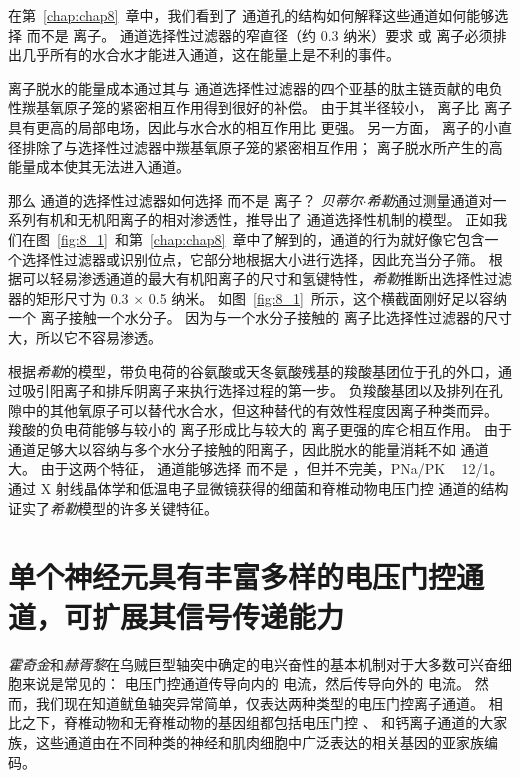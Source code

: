 在第~\ref{chap:chap8}~章中，我们看到了  通道孔的结构如何解释这些通道如何能够选择  而不是  离子。
 通道选择性过滤器的窄直径（约 0.3 纳米）要求  或  离子必须排出几乎所有的水合水才能进入通道，这在能量上是不利的事件。


 离子脱水的能量成本通过其与  通道选择性过滤器的四个亚基的肽主链贡献的电负性羰基氧原子笼的紧密相互作用得到很好的补偿。
由于其半径较小， 离子比  离子具有更高的局部电场，因此与水合水的相互作用比  更强。
另一方面， 离子的小直径排除了与选择性过滤器中羰基氧原子笼的紧密相互作用；
 离子脱水所产生的高能量成本使其无法进入通道。


那么  通道的选择性过滤器如何选择  而不是  离子？
\textit{贝蒂尔$\cdot$希勒}通过测量通道对一系列有机和无机阳离子的相对渗透性，推导出了  通道选择性机制的模型。
正如我们在图~\ref{fig:8_1}~和第~\ref{chap:chap8}~章中了解到的，通道的行为就好像它包含一个选择性过滤器或识别位点，它部分地根据大小进行选择，因此充当分子筛。
根据可以轻易渗透通道的最大有机阳离子的尺寸和氢键特性，\textit{希勒}推断出选择性过滤器的矩形尺寸为 0.3 × 0.5 纳米。
如图~\ref{fig:8_1}~所示，这个横截面刚好足以容纳一个  离子接触一个水分子。
因为与一个水分子接触的  离子比选择性过滤器的尺寸大，所以它不容易渗透。


根据\textit{希勒}的模型，带负电荷的谷氨酸或天冬氨酸残基的羧酸基团位于孔的外口，通过吸引阳离子和排斥阴离子来执行选择过程的第一步。
负羧酸基团以及排列在孔隙中的其他氧原子可以替代水合水，但这种替代的有效性程度因离子种类而异。
羧酸的负电荷能够与较小的  离子形成比与较大的  离子更强的库仑相互作用。
由于  通道足够大以容纳与多个水分子接触的阳离子，因此脱水的能量消耗不如  通道大。
由于这两个特征， 通道能够选择  而不是 ，但并不完美，PNa/PK ~ 12/1。
通过 X 射线晶体学和低温电子显微镜获得的细菌和脊椎动物电压门控  通道的结构证实了\textit{希勒}模型的许多关键特征。



\section{单个神经元具有丰富多样的电压门控通道，可扩展其信号传递能力}

\textit{霍奇金}和\textit{赫胥黎}在乌贼巨型轴突中确定的电兴奋性的基本机制对于大多数可兴奋细胞来说是常见的：
电压门控通道传导向内的  电流，然后传导向外的  电流。
然而，我们现在知道鱿鱼轴突异常简单，仅表达两种类型的电压门控离子通道。
相比之下，脊椎动物和无脊椎动物的基因组都包括电压门控 、 和钙离子通道的大家族，这些通道由在不同种类的神经和肌肉细胞中广泛表达的相关基因的亚家族编码。


